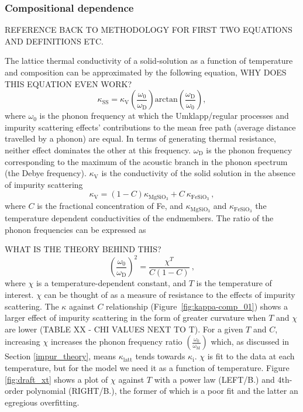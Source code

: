 \subsubsection{Compositional dependence}

REFERENCE BACK TO METHODOLOGY FOR FIRST TWO EQUATIONS AND DEFINITIONS ETC.

The lattice thermal conductivity of a solid-solution as a function of temperature and composition can be approximated by the following equation,
%
WHY DOES THIS EQUATION EVEN WORK?
%
\begin{equation}
\kappa_{\mathrm{SS}}=\kappa_{\mathrm{V}}\left ( \frac{\omega_{\mathrm{0}}}{\omega_{\mathrm{D}}} \right )\mathrm{arctan}\left ( \frac{\omega_{\mathrm{D}}}{\omega_{\mathrm{0}}} \right ),
\label{eq.ohta7}
\end{equation}
%
where $\omega_{\mathrm{0}}$ is the phonon frequency at which the Umklapp/regular processes and impurity scattering effects' contributions to the mean free path (average distance travelled by a phonon) are equal. In terms of generating thermal resistance, neither effect dominates the other at this frequency. $\omega_{\mathrm{D}}$ is the phonon frequency corresponding to the maximum of the acoustic branch in the phonon spectrum (the Debye frequency). $\kappa_{\mathrm{V}}$ is the conductivity of the solid solution in the absence of impurity scattering
%
\begin{equation}
\kappa_{\mathrm{V}}=\left ( 1-C \right )\kappa_{\mathrm{MgSiO_{3}}}+C\ \kappa_{\mathrm{FeSiO_{3}}}\ ,
\label{eq.ohta9}
\end{equation}
%
where $C$ is the fractional concentration of Fe, and $\kappa_{\mathrm{MgSiO_{3}}}$ and $\kappa_{\mathrm{FeSiO_{3}}}$ the temperature dependent conductivities of the endmembers. The ratio of the phonon frequencies can be expressed as

WHAT IS THE THEORY BEHIND THIS?
%
\begin{equation}
\left ( \frac{\omega_{\mathrm{0}}}{\omega_{\mathrm{D}}} \right )^{2}=\frac{\chi^{T}}{C\left ( 1-C \right )}\ ,
\label{eq.ohta8}
\end{equation}
%
where $\chi$ is a temperature-dependent constant, and $T$ is the temperature of interest. $\chi$ can be thought of as a measure of resistance to the effects of impurity scattering. The $\kappa$ against $C$ relationship (Figure~\ref{fig:kappa-comp_01}) shows a larger effect of impurity scattering in the form of greater curvature when $T$ and $\chi$ are lower (TABLE XX - CHI VALUES NEXT TO T). For a given $T$ and $C$, increasing $\chi$ increases the phonon frequency ratio $\left ( \frac{\omega_{\mathrm{0}}}{\omega_{\mathrm{M}}}\right )$ which, as discussed in Section \ref{impur_theory}, means $\kappa_{\mathrm{latt}}$ tends towards $\kappa_{\mathrm{i}}$. $\chi$ is fit to the data at each temperature, but for the model we need it as a function of temperature. Figure \ref{fig:draft_xt} shows a plot of $\chi$ against $T$ with a power law (LEFT/B.) and 4th-order polynomial (RIGHT/B.), the former of which is a poor fit and the latter an egregious overfitting. 

